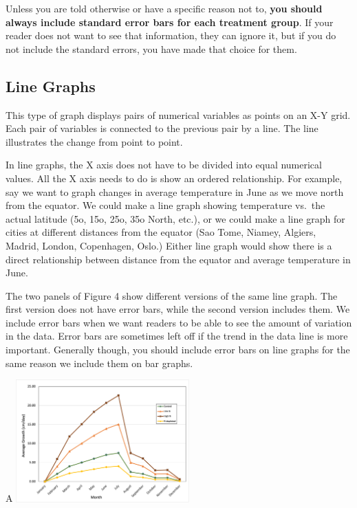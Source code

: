 \documentclass[
]{book}
\begin{document}
Unless you are told otherwise or have a specific reason not to, \textbf{you should always include standard error bars for each treatment group}. If your reader does not want to see that information, they can ignore it, but if you do not include the standard errors, you have made that choice for them.

\hypertarget{line-graphs}{%
\subsection{Line Graphs}\label{line-graphs}}

This type of graph displays pairs of numerical variables as points on an X-Y grid. Each pair of variables is connected to the previous pair by a line. The line illustrates the change from point to point.

In line graphs, the X axis does not have to be divided into equal numerical values. All the X axis needs to do is show an ordered relationship. For example, say we want to graph changes in average temperature in June as we move north from the equator. We could make a line graph showing temperature vs.~the actual latitude (5o, 15o, 25o, 35o North, etc.), or we could make a line graph for cities at different distances from the equator (Sao Tome, Niamey, Algiers, Madrid, London, Copenhagen, Oslo.) Either line graph would show there is a direct relationship between distance from the equator and average temperature in June.

The two panels of Figure 4 show different versions of the same line graph. The first version does not have error bars, while the second version includes them. We include error bars when we want readers to be able to see the amount of variation in the data. Error bars are sometimes left off if the trend in the data line is more important. Generally though, you should include error bars on line graphs for the same reason we include them on bar graphs.

A
\includegraphics[width=0.5\textwidth,height=\textheight]{images/Line-noSD.png}
\end{document}
